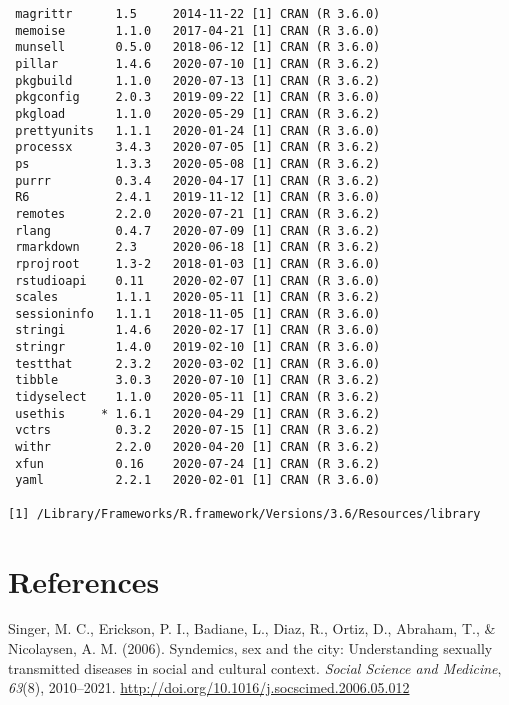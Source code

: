 \documentclass [11pt, proquest] {uwthesis}[2015/03/03]
\begin{document}
\begin{verbatim}
 magrittr      1.5     2014-11-22 [1] CRAN (R 3.6.0)                       
 memoise       1.1.0   2017-04-21 [1] CRAN (R 3.6.0)                       
 munsell       0.5.0   2018-06-12 [1] CRAN (R 3.6.0)                       
 pillar        1.4.6   2020-07-10 [1] CRAN (R 3.6.2)                       
 pkgbuild      1.1.0   2020-07-13 [1] CRAN (R 3.6.2)                       
 pkgconfig     2.0.3   2019-09-22 [1] CRAN (R 3.6.0)                       
 pkgload       1.1.0   2020-05-29 [1] CRAN (R 3.6.2)                       
 prettyunits   1.1.1   2020-01-24 [1] CRAN (R 3.6.0)                       
 processx      3.4.3   2020-07-05 [1] CRAN (R 3.6.2)                       
 ps            1.3.3   2020-05-08 [1] CRAN (R 3.6.2)                       
 purrr         0.3.4   2020-04-17 [1] CRAN (R 3.6.2)                       
 R6            2.4.1   2019-11-12 [1] CRAN (R 3.6.0)                       
 remotes       2.2.0   2020-07-21 [1] CRAN (R 3.6.2)                       
 rlang         0.4.7   2020-07-09 [1] CRAN (R 3.6.2)                       
 rmarkdown     2.3     2020-06-18 [1] CRAN (R 3.6.2)                       
 rprojroot     1.3-2   2018-01-03 [1] CRAN (R 3.6.0)                       
 rstudioapi    0.11    2020-02-07 [1] CRAN (R 3.6.0)                       
 scales        1.1.1   2020-05-11 [1] CRAN (R 3.6.2)                       
 sessioninfo   1.1.1   2018-11-05 [1] CRAN (R 3.6.0)                       
 stringi       1.4.6   2020-02-17 [1] CRAN (R 3.6.0)                       
 stringr       1.4.0   2019-02-10 [1] CRAN (R 3.6.0)                       
 testthat      2.3.2   2020-03-02 [1] CRAN (R 3.6.0)                       
 tibble        3.0.3   2020-07-10 [1] CRAN (R 3.6.2)                       
 tidyselect    1.1.0   2020-05-11 [1] CRAN (R 3.6.2)                       
 usethis     * 1.6.1   2020-04-29 [1] CRAN (R 3.6.2)                       
 vctrs         0.3.2   2020-07-15 [1] CRAN (R 3.6.2)                       
 withr         2.2.0   2020-04-20 [1] CRAN (R 3.6.2)                       
 xfun          0.16    2020-07-24 [1] CRAN (R 3.6.2)                       
 yaml          2.2.1   2020-02-01 [1] CRAN (R 3.6.0)                       

[1] /Library/Frameworks/R.framework/Versions/3.6/Resources/library
\end{verbatim}
\backmatter

\chapter*{References}\label{references}


\noindent

\setlength{\parindent}{-0.20in} \setlength{\leftskip}{0.20in}
\setlength{\parskip}{8pt}

\hypertarget{refs}{}
\hypertarget{ref-Singer2006}{}
Singer, M. C., Erickson, P. I., Badiane, L., Diaz, R., Ortiz, D.,
Abraham, T., \& Nicolaysen, A. M. (2006). Syndemics, sex and the city:
Understanding sexually transmitted diseases in social and cultural
context. \emph{Social Science and Medicine}, \emph{63}(8), 2010--2021.
\url{http://doi.org/10.1016/j.socscimed.2006.05.012}
\end{document}
